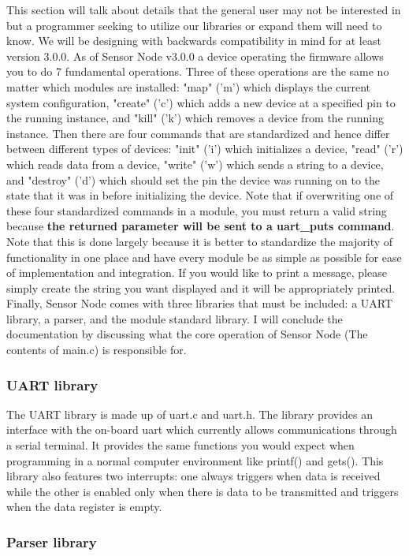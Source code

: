 \documentclass{article}
\begin{document}
This section will talk about details that the general user may not be interested in but a programmer seeking to utilize our libraries or expand them will need to know. We will be designing with backwards compatibility in mind for at least version 3.0.0. As of Sensor Node v3.0.0 a device operating the firmware allows you to do 7 fundamental operations. Three of these operations are the same no matter which modules are installed: "map" ('m') which displays the current system configuration, "create" ('c') which adds a new device at a specified pin to the running instance, and "kill" ('k') which removes a device from the running instance. Then there are four commands that are standardized and hence differ between different types of devices: "init" ('i') which initializes a device, "read" ('r') which reads data from a device, "write" ('w') which sends a string to a device, and "destroy" ('d') which should set the pin the device was running on to the state that it was in before initializing the device. Note that if overwriting one of these four standardized commands in a module, you must return a valid string because \textbf{the returned parameter will be sent to a uart\_puts command}. Note that this is done largely because it is better to standardize the majority of functionality in one place and have every module be as simple as possible for ease of implementation and integration. If you would like to print a message, please simply create the string you want displayed and it will be appropriately printed. Finally, Sensor Node comes with three libraries that must be included: a UART library, a parser, and the module standard library. I will conclude the documentation by discussing what the core operation of Sensor Node (The contents of main.c) is responsible for.

\subsubsection{UART library}

The UART library is made up of uart.c and uart.h. The library provides an interface with the on-board uart which currently allows communications through a serial terminal. It provides the same functions you would expect when programming in a normal computer environment like printf() and gets(). This library also features two interrupts: one always triggers when data is received while the other is enabled only when there is data to be transmitted and triggers when the data register is empty.

\subsubsection{Parser library}
\end{document}
